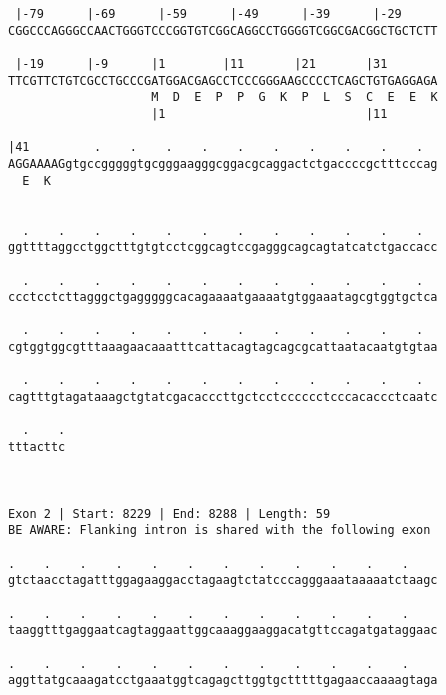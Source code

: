 \documentclass{article}
\begin{document}
\begin{Verbatim}
 |-79      |-69      |-59      |-49      |-39      |-29     
CGGCCCAGGGCCAACTGGGTCCCGGTGTCGGCAGGCCTGGGGTCGGCGACGGCTGCTCTT
                                                            
 |-19      |-9      |1        |11       |21       |31       
TTCGTTCTGTCGCCTGCCCGATGGACGAGCCTCCCGGGAAGCCCCTCAGCTGTGAGGAGA
                    M  D  E  P  P  G  K  P  L  S  C  E  E  K
                    |1                            |11       
  
|41         .    .    .    .    .    .    .    .    .    .  
AGGAAAAGgtgccgggggtgcgggaagggcggacgcaggactctgaccccgctttcccag
  E  K                                                      
                                                            
  
  .    .    .    .    .    .    .    .    .    .    .    .  
ggttttaggcctggctttgtgtcctcggcagtccgagggcagcagtatcatctgaccacc
                                                            
  .    .    .    .    .    .    .    .    .    .    .    .  
ccctcctcttagggctgagggggcacagaaaatgaaaatgtggaaatagcgtggtgctca
                                                            
  .    .    .    .    .    .    .    .    .    .    .    .  
cgtggtggcgtttaaagaacaaatttcattacagtagcagcgcattaatacaatgtgtaa
                                                            
  .    .    .    .    .    .    .    .    .    .    .    .  
cagtttgtagataaagctgtatcgacacccttgctcctcccccctcccacaccctcaatc
                                                            
  .    .
tttacttc
        
        
 
Exon 2 | Start: 8229 | End: 8288 | Length: 59
BE AWARE: Flanking intron is shared with the following exon
 
.    .    .    .    .    .    .    .    .    .    .    .    
gtctaacctagatttggagaaggacctagaagtctatcccagggaaataaaaatctaagc
                                                            
.    .    .    .    .    .    .    .    .    .    .    .    
taaggtttgaggaatcagtaggaattggcaaaggaaggacatgttccagatgataggaac
                                                            
.    .    .    .    .    .    .    .    .    .    .    .    
aggttatgcaaagatcctgaaatggtcagagcttggtgctttttgagaaccaaaagtaga
                                                            

\end{Verbatim}
\end{document}
